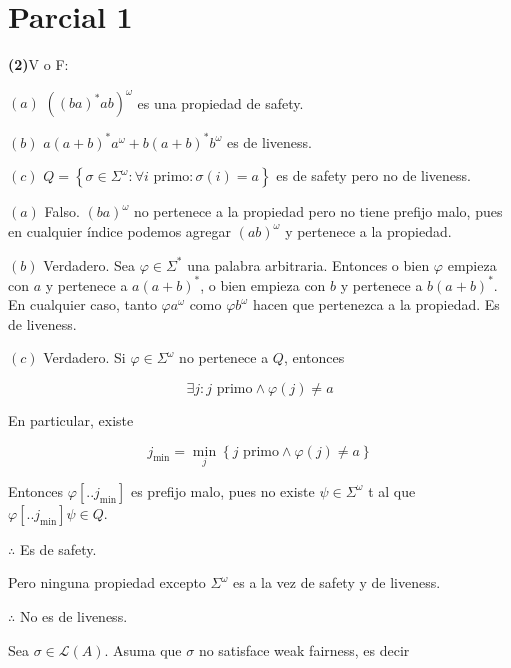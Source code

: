 \documentclass[a4paper, 12pt]{article}
\begin{document}
\pagebreak 

\section{Parcial 1}

\begin{myframe}
\textbf{(2)}V o F: 

$(a)$ $((ba)^* ab)^\omega$ es una propiedad de safety. 

$(b)$ $a(a+b)^* a^\omega + b(a+b)^* b^\omega$ es de liveness. 

$(c)$ $Q = \left\{ \sigma \in \Sigma^\omega : \forall i \text{ primo} :
\sigma(i) = a \right\} $ es de safety pero no de liveness.
\end{myframe}

$(a)$ Falso. $(ba)^\omega$ no pertenece a la propiedad pero no tiene prefijo
malo, pues en cualquier índice podemos agregar $(ab)^\omega$ y pertenece a la
propiedad.

$(b)$ Verdadero. Sea $\varphi \in \Sigma^*$ una palabra arbitraria. Entonces o bien
$\varphi$ empieza con $a$ y pertenece a $a(a+b)^*$, o bien empieza con $b$
y pertenece a $b(a+b)^*$. En cualquier caso, tanto $\varphi a^\omega$ como
$\varphi b^\omega$ hacen que pertenezca a la propiedad. Es de liveness.

$(c)$ Verdadero. Si $\varphi \in \Sigma^\omega$ no pertenece a $Q$, entonces 

\begin{equation*}
    \exists j : j \text{ primo} \land \varphi(j) \neq a
\end{equation*}

En particular, existe 

\begin{equation*}
    j_{\text{min}} = \min_j \left\{j \text{ primo} \land  \varphi(j) \neq a \right\} 
\end{equation*}

Entonces $\varphi[..j_{\text{min}}]$ es prefijo malo, pues no existe $\psi \in
\Sigma^\omega$ t al
que $\varphi[..j_{\text{min}}] \psi \in Q$. 

$\therefore $ Es de safety.

Pero ninguna propiedad excepto $\Sigma^\omega$ es a la vez de safety y de
liveness. 

$\therefore $ No es de liveness. 


\pagebreak

\pagebreak 

Sea $\sigma \in \mathcal{L}(A)$. Asuma que $\sigma$ no satisface weak fairness,
es decir 
\end{document}
